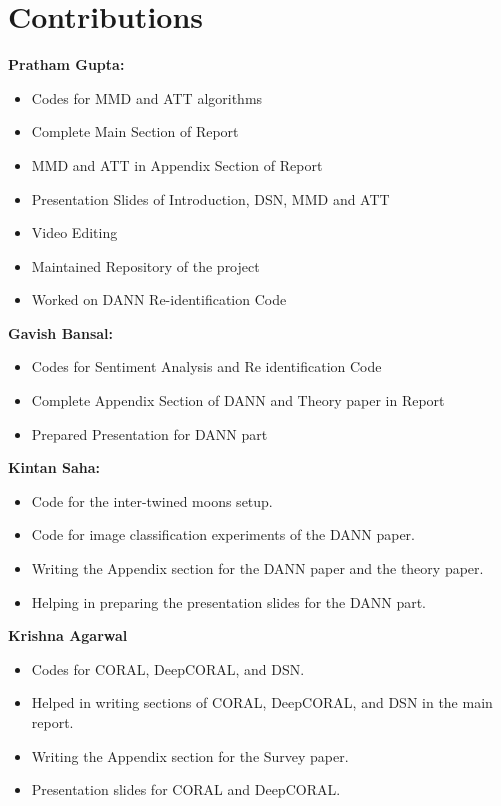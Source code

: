 \documentclass{article}
\begin{document}
\section*{Contributions}
\textbf{Pratham Gupta:}
\begin{itemize}
    \item Codes for MMD and ATT algorithms
    \item Complete Main Section of Report 
    \item MMD and ATT in Appendix Section of Report
    \item Presentation Slides of Introduction, DSN, MMD and ATT
    \item Video Editing 
    \item Maintained Repository of the project
    \item Worked on DANN Re-identification Code
\end{itemize}
\textbf{Gavish Bansal:}
\begin{itemize}
    \item Codes for Sentiment Analysis and Re identification Code
    \item Complete Appendix Section of DANN and Theory paper in Report 
    \item Prepared Presentation for DANN part
\end{itemize}
\textbf{Kintan Saha:}
\begin{itemize}
    \item Code for the inter-twined moons setup.
    \item Code for image classification experiments of the DANN paper.
    \item Writing the Appendix section for the DANN paper and the theory paper.
    \item Helping in preparing the presentation slides for the DANN part.
\end{itemize}
\textbf{Krishna Agarwal}
\begin{itemize}
    \item Codes for CORAL, DeepCORAL, and DSN.
    \item Helped in writing sections of CORAL, DeepCORAL, and DSN in the main report.
    \item Writing the Appendix section for the Survey paper.
    \item Presentation slides for CORAL and DeepCORAL.
\end{itemize}





\end{document}
